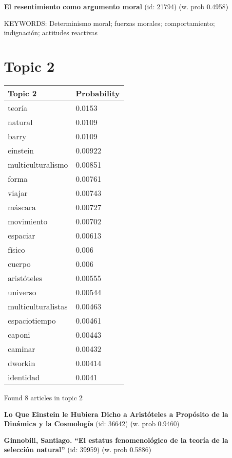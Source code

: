 \documentclass{article}
\begin{document}
\textbf{El resentimiento como argumento moral} (id: 21794)
 (w. prob 0.4958)


KEYWORDS:
Determinismo moral; fuerzas morales; comportamiento; indignación; actitudes reactivas

\vfill
\newpage


\centering
\thispagestyle{empty}
\section*{Topic 2}\vfill
\begin{tabular}{ll}
\toprule
            Topic 2 & Probability \\
\midrule
             teoría &      0.0153 \\
            natural &      0.0109 \\
              barry &      0.0109 \\
           einstein &     0.00922 \\
  multiculturalismo &     0.00851 \\
              forma &     0.00761 \\
             viajar &     0.00743 \\
            máscara &     0.00727 \\
         movimiento &     0.00702 \\
           espaciar &     0.00613 \\
             físico &       0.006 \\
             cuerpo &       0.006 \\
        aristóteles &     0.00555 \\
           universo &     0.00544 \\
 multiculturalistas &     0.00463 \\
      espaciotiempo &     0.00461 \\
             caponi &     0.00443 \\
            caminar &     0.00432 \\
            dworkin &     0.00414 \\
          identidad &      0.0041 \\
\bottomrule
\end{tabular}

\vfill
Found 8 articles in topic 2
\vfill

\textbf{Lo Que Einstein le Hubiera Dicho a Aristóteles a Propósito de la Dinámica y la Cosmología} (id: 36642)
 (w. prob 0.9460)
\vfill

\textbf{Ginnobili, Santiago. “El estatus fenomenológico de la teoría de la selección natural”} (id: 39959)
 (w. prob 0.5886)
\vfill
\end{document}
